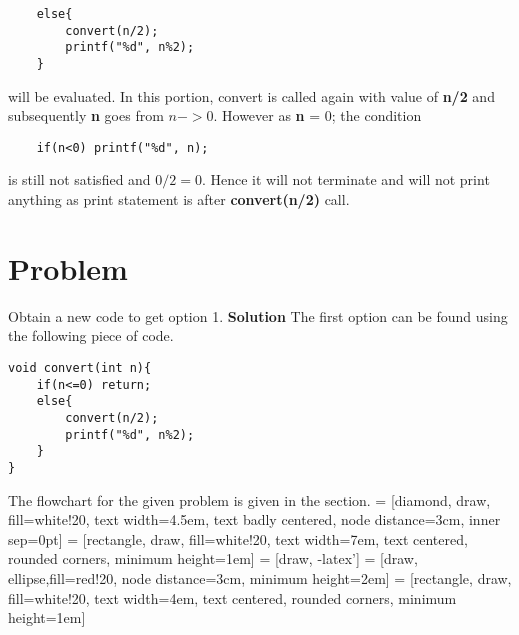 \documentclass[journal,12pt,twocolumn]{IEEEtran}
\begin{document}
\begin{lstlisting}
    else{
        convert(n/2);
        printf("%d", n%2);
    }
\end{lstlisting}
\setcounter{figure}{0}
will be evaluated. In this portion, convert is called again with value of \textbf{n/2} and subsequently \textbf{n} goes from $n -> 0$.
\newline
\newline
\newline
\newline
However as \textbf{n} = 0; the condition 
\newline
\begin{lstlisting}
    if(n<0) printf("%d", n);
\end{lstlisting}
\setcounter{figure}{0}
is still not satisfied and $0/2 = 0$. Hence it will not terminate and will not print anything as print statement is after \textbf{convert(n/2)} call.




\section{Problem}
Obtain a new code to get option 1.
\newline
\textbf{Solution}
\newline
The first option can be found using the following piece of code.

\begin{lstlisting}
void convert(int n){
    if(n<=0) return;
    else{
        convert(n/2);
        printf("%d", n%2);
    }
}

\end{lstlisting}
\setcounter{figure}{0}

The flowchart for the given problem is given in the  section.
 = [diamond, draw, fill=white!20, 
    text width=4.5em, text badly centered, node distance=3cm, inner sep=0pt]
 = [rectangle, draw, fill=white!20, 
    text width=7em, text centered, rounded corners, minimum height=1em]
 = [draw, -latex']
 = [draw, ellipse,fill=red!20, node distance=3cm,
    minimum height=2em]
 = [rectangle, draw, fill=white!20, 
    text width=4em, text centered, rounded corners, minimum height=1em]
\end{document}
